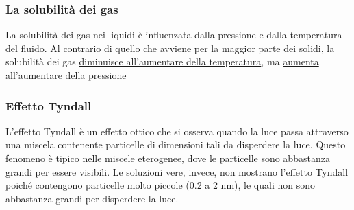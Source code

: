 \documentclass{article}
\begin{document}
\subsubsection{La solubilità dei gas}
La solubilità dei gas nei liquidi è influenzata dalla pressione e dalla temperatura del fluido.
Al contrario di quello che avviene per la maggior parte dei solidi, la solubilità dei gas
\underline{diminuisce all'aumentare della temperatura}, ma \underline{aumenta all'aumentare della pressione} \\



\subsubsection{Effetto Tyndall}
L'effetto Tyndall è un effetto ottico che si osserva quando la luce passa attraverso una miscela
contenente particelle di dimensioni tali da disperdere la luce.
Questo fenomeno è tipico nelle miscele eterogenee, dove le particelle sono abbastanza grandi
per essere visibili. Le soluzioni vere, invece, non mostrano l'effetto Tyndall poiché contengono
particelle molto piccole (0.2 a 2 nm), le quali non sono abbastanza grandi per disperdere la luce.
\end{document}
